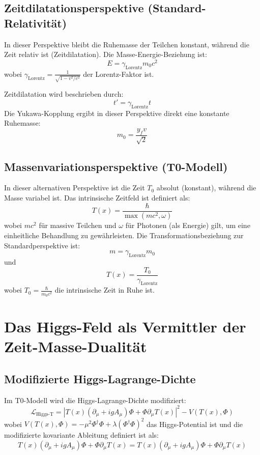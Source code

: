 \documentclass[a4paper,12pt]{article}
\newcommand{\Tfield}{T(x)}
\newcommand{\Tzero}{T_0}
\newcommand{\DhiggsT}{\Tfield (\partial_\mu + ig A_\mu) \Phi + \Phi \partial_\mu \Tfield}
\newcommand{\gammaf}{\gamma_{\text{Lorentz}}}
\begin{document}
	\subsection{Zeitdilatationsperspektive (Standard-Relativität)}
	In dieser Perspektive bleibt die Ruhemasse der Teilchen konstant, während die Zeit relativ ist (Zeitdilatation). Die Masse-Energie-Beziehung ist:
	\begin{equation}
		E = \gammaf m_0 c^2
	\end{equation}
	wobei \( \gammaf = \frac{1}{\sqrt{1-v^2/c^2}} \) der Lorentz-Faktor ist.
	
	Zeitdilatation wird beschrieben durch:
	\begin{equation}
		t' = \gammaf t
	\end{equation}
	Die Yukawa-Kopplung ergibt in dieser Perspektive direkt eine konstante Ruhemasse:
	\begin{equation}
		m_0 = \frac{y_f v}{\sqrt{2}}
	\end{equation}
	
	\subsection{Massenvariationsperspektive (T0-Modell)}
	In dieser alternativen Perspektive ist die Zeit \( \Tzero \) absolut (konstant), während die Masse variabel ist. Das intrinsische Zeitfeld ist definiert als:
	\begin{equation}
		\Tfield = \frac{\hbar}{\max(m c^2, \omega)}
	\end{equation}
	wobei \( m c^2 \) für massive Teilchen und \( \omega \) für Photonen (als Energie) gilt, um eine einheitliche Behandlung zu gewährleisten. Die Transformationsbeziehung zur Standardperspektive ist:
	\begin{equation}
		m = \gammaf m_0
	\end{equation}
	und
	\begin{equation}
		\Tfield = \frac{\Tzero}{\gammaf}
	\end{equation}
	wobei \( \Tzero = \frac{\hbar}{m_0 c^2} \) die intrinsische Zeit in Ruhe ist.
	
	\section{Das Higgs-Feld als Vermittler der Zeit-Masse-Dualität}
	\subsection{Modifizierte Higgs-Lagrange-Dichte}
	Im T0-Modell wird die Higgs-Lagrange-Dichte modifiziert:
	\begin{equation}
		\mathcal{L}_{\text{Higgs-T}} = |\DhiggsT|^2 - V(\Tfield, \Phi)
	\end{equation}
	wobei \( V(\Tfield, \Phi) = -\mu^2 \Phi^\dagger \Phi + \lambda (\Phi^\dagger \Phi)^2 \) das Higgs-Potential ist und die modifizierte kovariante Ableitung definiert ist als:
	\begin{equation}
		\DhiggsT = \Tfield (\partial_\mu + ig A_\mu) \Phi + \Phi \partial_\mu \Tfield
	\end{equation}
	
\end{document}

